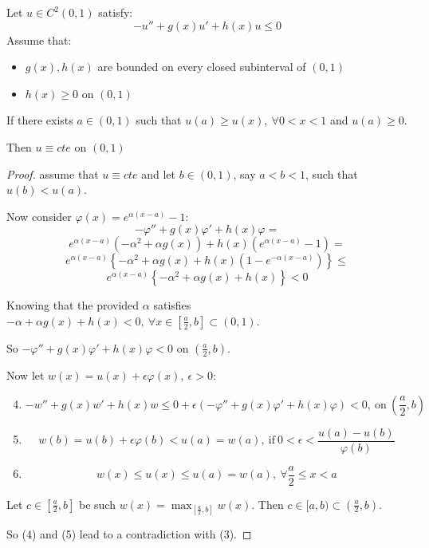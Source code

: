 \begin{theorem}
	Let $u \in C^2(0,1)$ satisfy:
	\[-u'' + g(x)u' + h(x)u \leq 0\]
	Assume that:
	\begin{itemize}
		\item $g(x), h(x)$ are bounded on every closed subinterval of $(0,1)$
		\item $h(x) \geq 0$ on $(0,1)$
	\end{itemize}
	If there exists $a \in (0,1)$ such that $u(a) \geq u(x),\ \forall 0<x<1$ and $u(a) \geq 0$.

	Then $u \equiv cte$ on $(0,1)$
\end{theorem}
\begin{proof}
	assume that $u \equiv cte$ and let $b \in (0,1)$, say $a < b < 1$, such that $u(b) < u(a)$.

	Now consider $\varphi(x) = e^{\alpha(x - a)} - 1$:
	\[-\varphi'' + g(x)\varphi' + h(x)\varphi =\]
	\[e^{\alpha(x - a)} (-\alpha^2 + \alpha g(x)) + h(x)(e^{\alpha(x - a)} - 1) =\]
	\[e^{\alpha(x - a)} \left\{-\alpha^2 + \alpha g(x) + h(x)(1 - e^{-\alpha(x - a)}) \right\} \leq\]
	\[e^{\alpha(x - a)} \left\{-\alpha^2 + \alpha g(x) + h(x)\right\} < 0\]

	Knowing that the provided $\alpha$ satisfies $-\alpha + \alpha g(x) + h(x) < 0,\ \forall x \in [\frac{a}{2}, b] \subset (0,1)$.

	So $-\varphi'' + g(x)\varphi' + h(x)\varphi < 0$ on $(\frac{a}{2}, b)$.

	Now let $w(x) = u(x) + \epsilon \varphi(x),\ \epsilon > 0$:
	\begin{enumerate}
		\setcounter{enumi}{3}
		\item \[-w'' + g(x)w' + h(x)w \leq 0 + \epsilon (-\varphi'' + g(x)\varphi' + h(x)\varphi) < 0,\ \text{on}\ (\frac{a}{2}, b)\]
		\item \[w(b) = u(b) + \epsilon \varphi(b) < u(a) = w(a),\ \text{if}\ 0 < \epsilon < \frac{u(a) - u(b)}{\varphi(b)}\]
		\item \[w(x) \leq u(x) \leq u(a) = w(a),\ \forall \frac{a}{2} \leq x < a\]
	\end{enumerate}

	Let $c \in [\frac{a}{2}, b]$ be such $w(x) = \max_{[\frac{a}{2}, b]}w(x)$. Then $c \in [a,b) \subset (\frac{a}{2}, b)$.

	So (4) and (5) lead to a contradiction with (3).
\end{proof}
